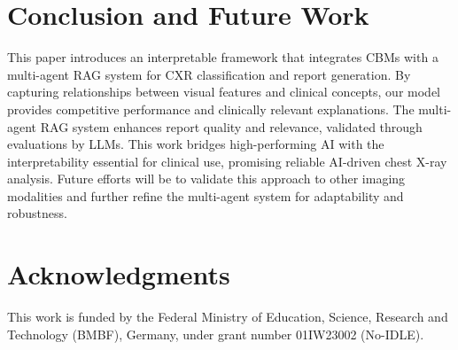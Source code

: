 \documentclass[runningheads]{llncs}
\begin{document}
\section{Conclusion and Future Work}
This paper introduces an interpretable framework that integrates CBMs with a multi-agent RAG system for CXR classification and report generation. By capturing relationships between visual features and clinical concepts, our model provides competitive performance and clinically relevant explanations. The multi-agent RAG system enhances report quality and relevance, validated through evaluations by LLMs. This work bridges high-performing AI with the interpretability essential for clinical use, promising reliable AI-driven chest X-ray analysis. Future efforts will be to validate this approach to other imaging modalities and further refine the multi-agent system for adaptability and robustness.

\section*{Acknowledgments}
This work is funded by the Federal Ministry of Education, Science, Research and Technology (BMBF), Germany, under grant number 01IW23002 (No-IDLE).



\end{document}
